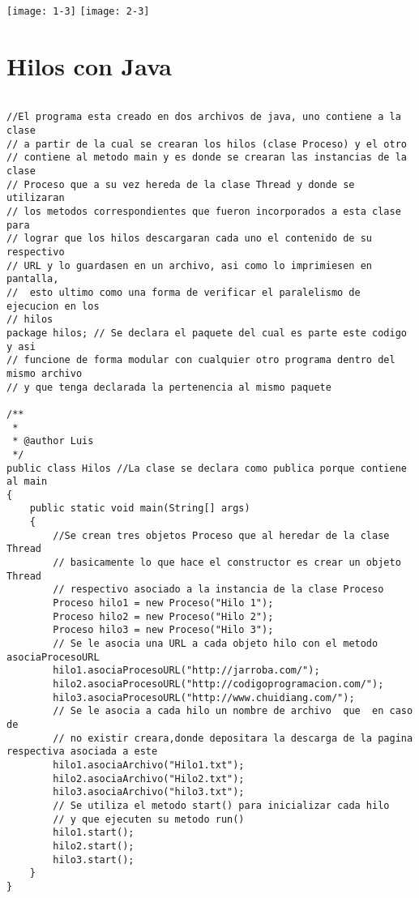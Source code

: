 \documentclass[12pt]{article} %
\begin{document}
\texttt{[image: 1-3]}
\texttt{[image: 2-3]}


\section{Hilos con Java}

\begin{lstlisting}

//El programa esta creado en dos archivos de java, uno contiene a la clase 
// a partir de la cual se crearan los hilos (clase Proceso) y el otro
// contiene al metodo main y es donde se crearan las instancias de la clase
// Proceso que a su vez hereda de la clase Thread y donde se utilizaran
// los metodos correspondientes que fueron incorporados a esta clase para 
// lograr que los hilos descargaran cada uno el contenido de su respectivo
// URL y lo guardasen en un archivo, asi como lo imprimiesen en pantalla,
//  esto ultimo como una forma de verificar el paralelismo de ejecucion en los 
// hilos
package hilos; // Se declara el paquete del cual es parte este codigo y asi
// funcione de forma modular con cualquier otro programa dentro del mismo archivo
// y que tenga declarada la pertenencia al mismo paquete 

/**
 *
 * @author Luis
 */
public class Hilos //La clase se declara como publica porque contiene al main
{
    public static void main(String[] args) 
    {
        //Se crean tres objetos Proceso que al heredar de la clase Thread
        // basicamente lo que hace el constructor es crear un objeto Thread
        // respectivo asociado a la instancia de la clase Proceso
        Proceso hilo1 = new Proceso("Hilo 1");
        Proceso hilo2 = new Proceso("Hilo 2");
        Proceso hilo3 = new Proceso("Hilo 3");
        // Se le asocia una URL a cada objeto hilo con el metodo asociaProcesoURL
        hilo1.asociaProcesoURL("http://jarroba.com/");
        hilo2.asociaProcesoURL("http://codigoprogramacion.com/");
        hilo3.asociaProcesoURL("http://www.chuidiang.com/");
        // Se le asocia a cada hilo un nombre de archivo  que  en caso de 
        // no existir creara,donde depositara la descarga de la pagina respectiva asociada a este
        hilo1.asociaArchivo("Hilo1.txt");
        hilo2.asociaArchivo("Hilo2.txt");
        hilo3.asociaArchivo("hilo3.txt");
        // Se utiliza el metodo start() para inicializar cada hilo
        // y que ejecuten su metodo run()
        hilo1.start();
        hilo2.start();
        hilo3.start();
    }
}



\end{lstlisting}
\end{document}
